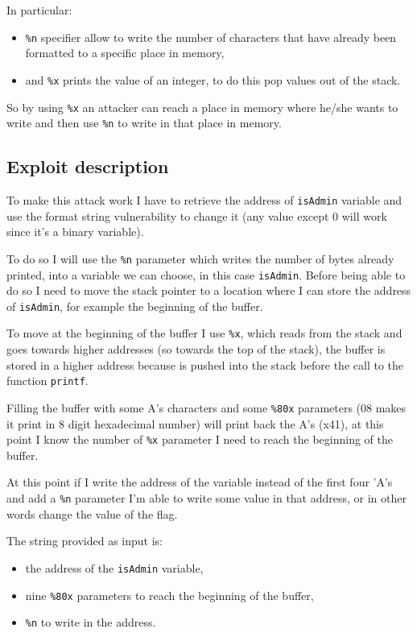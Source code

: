 \documentclass[a4paper,12pt]{article}
\begin{document}
In particular:
\begin{itemize}
\item \texttt{\%n} specifier allow to write the number of characters that have already been formatted to a specific place in memory,
\item and \texttt{\%x} prints the value of an integer, to do this pop values out of the stack.
\end{itemize} 

So by using \texttt{\%x} an attacker can reach a place in memory where he/she wants to write and then use \texttt{\%n} to write in that place in memory.


\subsection{Exploit description}

To make this attack work I have to retrieve the address of \texttt{isAdmin} variable and use the format string vulnerability to change it (any value except 0 will work since it's a binary variable). 

To do so I will use the \texttt{\%n} parameter which writes the number of bytes already printed, into a variable we can choose, in this case \texttt{isAdmin}. Before being able to do so I need to move the stack pointer to a location where I can store the address of \texttt{isAdmin}, for example the beginning of the buffer.

To move at the beginning of the buffer I use \texttt{\%x}, which reads from the stack and goes towards higher addresses (so towards the top of the stack), the buffer is stored in a higher address because is pushed into the stack before the call to the function \texttt{printf}.

Filling the buffer with some A's characters and some \texttt{\%80x} parameters (08 makes it print in 8 digit hexadecimal number) will print back the A's (x41), at this point I know the number of \texttt{\%x} parameter I need to reach the beginning of the buffer.

At this point if I write the address of the variable instead of the first four 'A's and add a \texttt{\%n} parameter I'm able to write some value in that address, or in other words change the value of the flag.

The string provided as input is:
\begin{itemize}
\item the address of the \texttt{isAdmin} variable,
\item nine \texttt{\%80x} parameters to reach the beginning of the buffer,
\item \texttt{\%n} to write in the address.
\end{itemize}
\end{document}

